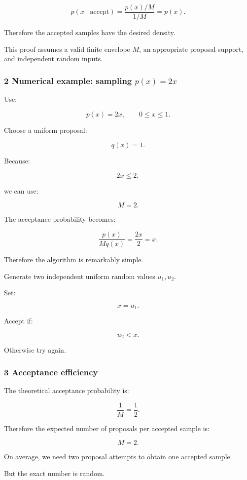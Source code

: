\[
 p(x\mid\text{accept}) = \frac{p(x)/M}{1/M} =p(x).
\]

Therefore the accepted samples have the desired density.

This proof assumes a valid finite envelope \(M\), an appropriate proposal support, and independent random inputs.

\subsubsection{\texorpdfstring{2 Numerical example: sampling \(p(x)=2x\)}{2 Numerical example: sampling p(x)=2x}}\label{02-foundations-ii-ch029-numerical-example-sampling-px2x}

Use:

\[
 p(x)=2x,\qquad0\le x\le1.
\]

Choose a uniform proposal:

\[
 q(x)=1.
\]

Because:

\[
 2x\le2,
\]

we can use:

\[
 M=2.
\]

The acceptance probability becomes:

\[
 \frac{p(x)}{Mq(x)} = \frac{2x}{2} =x.
\]

Therefore the algorithm is remarkably simple.

Generate two independent uniform random values \(u_1,u_2\).

Set:

\[
 x=u_1.
\]

Accept if:

\[
 \boxed{u_2<x}.
\]

Otherwise try again.

\subsubsection{3 Acceptance efficiency}\label{02-foundations-ii-ch029-acceptance-efficiency}

The theoretical acceptance probability is:

\[
 \frac1M=\frac12.
\]

Therefore the expected number of proposals per accepted sample is:

\[
 \boxed{M=2}.
\]

On average, we need two proposal attempts to obtain one accepted sample.

But the exact number is random.

